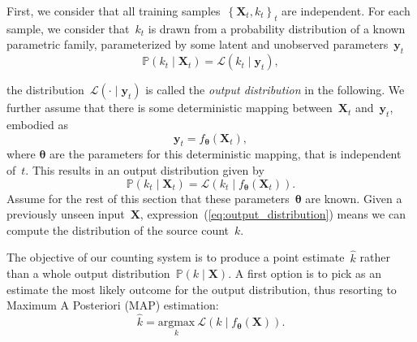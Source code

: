 First, we consider that all training samples~$\left\{\mathbf{X}_t,k_t\right\}_t$ are independent.
For each sample, we consider that~$k_t$ is drawn from a probability distribution of a known parametric family, parameterized by some latent and unobserved parameters~$\mathbf{y}_t$
\begin{equation}
\mathbb{P}\left(k_{t}\mid\mathbf{X}_{t}\right)=\mathcal{L}\left(k_{t}\mid \mathbf{y}_{t}\right),
\end{equation}


the distribution~$\mathcal{L}\left(\cdot\mid \mathbf{y}_{t}\right)$ is called the \textit{output distribution} in the following.
We further assume that there is some deterministic mapping between~$\mathbf{X}_t$ and~$\mathbf{y}_t$, embodied as
\begin{equation}
\mathbf{y}_{t}=f_{\mathbf{\theta}}\left(\mathbf{X}_{t}\right),
\end{equation}
where $\mathbf{\theta}$ are the parameters for this deterministic mapping, that is independent of~$t$. This results in an output distribution given by
\begin{equation}
\mathbb{P}\left(k_{t}\mid\mathbf{X}_{t}\right)=\mathcal{L}\left(k_{t}\mid f_{\mathbf{\theta}}\left(\mathbf{X}_{t}\right)\right).\label{eq:output_distribution}
\end{equation}
Assume for the rest of this section that these parameters~$\mathbf{\theta}$ are known.
Given a previously unseen input~$\mathbf{X}$, expression~(\ref{eq:output_distribution}) means we can compute the distribution of the source count~$k$.

The objective of our counting system is to produce a point estimate~$\hat{k}$ rather than a whole output distribution~$\mathbb{P}\left(k\mid\mathbf{X}\right)$.
A first option is to pick as an estimate the most likely outcome for the output distribution, thus resorting to Maximum A Posteriori (MAP) estimation:
\begin{equation}
\hat{k}=\underset{k}{\text{argmax}}\ \mathcal{L}\left(k\mid f_{\mathbf{\theta}}\left(\mathbf{X}\right)\right).
\end{equation}


